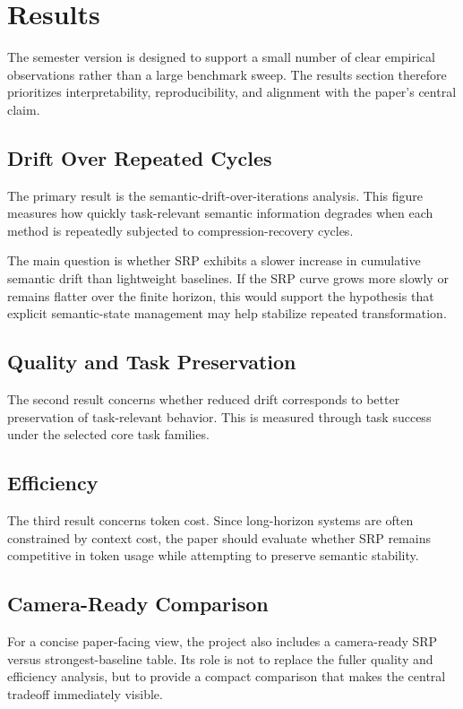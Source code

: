 \documentclass[11pt]{article}
\begin{document}
\section{Results}
The semester version is designed to support a small number of clear empirical observations rather than a large benchmark sweep. The results section therefore prioritizes interpretability, reproducibility, and alignment with the paper's central claim.

\subsection{Drift Over Repeated Cycles}

The primary result is the semantic-drift-over-iterations analysis. This figure measures how quickly task-relevant semantic information degrades when each method is repeatedly subjected to compression-recovery cycles.

The main question is whether SRP exhibits a slower increase in cumulative semantic drift than lightweight baselines. If the SRP curve grows more slowly or remains flatter over the finite horizon, this would support the hypothesis that explicit semantic-state management may help stabilize repeated transformation.

\subsection{Quality and Task Preservation}

The second result concerns whether reduced drift corresponds to better preservation of task-relevant behavior. This is measured through task success under the selected core task families.

\subsection{Efficiency}

The third result concerns token cost. Since long-horizon systems are often constrained by context cost, the paper should evaluate whether SRP remains competitive in token usage while attempting to preserve semantic stability.

\subsection{Camera-Ready Comparison}

For a concise paper-facing view, the project also includes a camera-ready SRP versus strongest-baseline table. Its role is not to replace the fuller quality and efficiency analysis, but to provide a compact comparison that makes the central tradeoff immediately visible.
\end{document}
